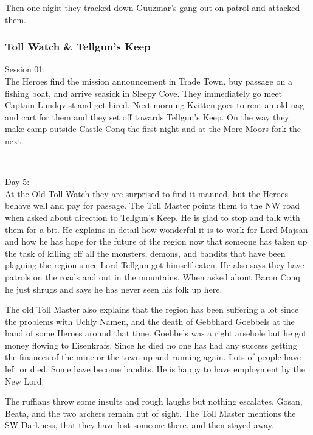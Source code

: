Then one night they tracked down Guuzmar's gang out on patrol and attacked them.











\subsubsection*{Toll Watch \& Tellgun's Keep}
\forceindent Session 01:\\                                              %
The Heroes find the mission announcement in Trade Town, buy passage on a fishing boat, and arrive seasick in Sleepy Cove. They immediately go meet Captain Lundqvist and get hired.
Next morning Kvitten goes to rent an old nag and cart for them and they set off towards Tellgun's Keep. On the way they make camp outside Castle Conq the first night and at the More Moors fork the next.

\

Day 5:\\
At the Old Toll Watch they are surprised to find it manned, but the Heroes behave well and pay for passage. The Toll Master points them to the NW road when asked about direction to Tellgun's Keep. He is glad to stop and talk with them for a bit. He explains in detail how wonderful it is to work for Lord Majsan and how he has hope for the future of the region now that someone has taken up the task of killing off all the monsters, demons, and bandits that have been plaguing the region since Lord Tellgun got himself eaten. He also says they have patrols on the roads and out in the mountains. When asked about Baron Conq he just shrugs and says he has never seen his folk up here.

The old Toll Master also explains that the region has been suffering a lot since the problems with Uchly Namen, and the death of Gebbhard Goebbels at the hand of some Heroes around that time. Goebbels was a right arsehole but he got money flowing to Eisenkrafs. Since he died no one has had any success getting the finances of the mine or the town up and running again. Lots of people have left or died. Some have become bandits. He is happy to have employment by the New Lord.

The ruffians throw some insults and rough laughs but nothing escalates. Gosan, Beata, and the two archers remain out of sight. The Toll Master mentions the SW Darkness, that they have lost someone there, and then stayed away.

